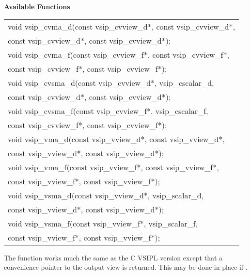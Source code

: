 \cvsiplh
\newline \hspace*{.8cm} \vspace*{.1cm} \textbf{Available Functions }
\newline \hspace*{1.1cm} {
\ttfamily
\begin{tabular}[H]{l}
void vsip\_cvma\_d(const vsip\_cvview\_d*, const vsip\_cvview\_d*,\\*\hspace{.7cm}const vsip\_cvview\_d*, const vsip\_cvview\_d*);\\
void vsip\_cvma\_f(const vsip\_cvview\_f*, const vsip\_cvview\_f*,\\*\hspace{.7cm}const vsip\_cvview\_f*, const vsip\_cvview\_f*);\\
void vsip\_cvsma\_d(const vsip\_cvview\_d*, vsip\_cscalar\_d,\\*\hspace{.7cm}const vsip\_cvview\_d*, const vsip\_cvview\_d*);\\
void vsip\_cvsma\_f(const vsip\_cvview\_f*, vsip\_cscalar\_f,\\*\hspace{.7cm}const vsip\_cvview\_f*, const vsip\_cvview\_f*);\\
void vsip\_vma\_d(const vsip\_vview\_d*, const vsip\_vview\_d*,\\*\hspace{.7cm}const vsip\_vview\_d*, const vsip\_vview\_d*);\\
void vsip\_vma\_f(const vsip\_vview\_f*, const vsip\_vview\_f*,\\*\hspace{.7cm}const vsip\_vview\_f*, const vsip\_vview\_f*);\\
void vsip\_vsma\_d(const vsip\_vview\_d*, vsip\_scalar\_d,\\*\hspace{.7cm}const vsip\_vview\_d*, const vsip\_vview\_d*);\\
void vsip\_vsma\_f(const vsip\_vview\_f*, vsip\_scalar\_f,\\*\hspace{.7cm}const vsip\_vview\_f*, const vsip\_vview\_f*);\\
\end{tabular}
}
\pyjvsiph
{}
\newline\hspace*{1.2cm}\parbox{10.8cm}{\vspace*{.1cm}The  function works much the same as the C VSIPL version except that a convenience pointer to the output view is returned. This may be done in-place if .}